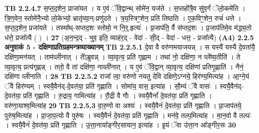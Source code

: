 \documentclass[17pt]{extarticle}
\begin{document}
                  \newline
                                \textbf{ TB 2.2.4.7} \newline
                  स॒प्त॒द॒शेन॒ प्राजा॑यत । य ए॒वं ॅवि॒द्वान्थ् सोमे॑न॒ यज॑ते । स॒प्तहो᳚त्रै॒व सु॑व॒र्गं ॅलो॒कमे॑ति । त्रि॒ण॒वेन॒ स्तोमे॑नै॒भ्यो लो॒केभ्यो॒ भ्रातृ॑व्या॒न्-प्रणु॑दते । त्र॒य॒स्त्रिꣳ॒॒शेन॒ प्रति॑ तिष्ठति । ए॒क॒विꣳ॒॒शेन॒ रुचं॑ धत्ते । स॒प्त॒द॒शेन॒ प्रजा॑यते । तस्मा᳚थ्-सप्तद॒शः स्तोमो॒ न नि॒र्॒.हृत्यः॑ । प्र॒जाप॑ति॒ र्वै स॑प्तद॒शः । प्र॒जाप॑तिमे॒व म॑द्ध्य॒तो ध॑त्ते॒ प्रजा᳚त्यै ( ) । \textbf{ 27} \newline
                  \newline
                                    (अ॒न॒न्द॒द् - भुव॒ इति॒ व्याह॑र॒द् - वेदा॑ - सी॒द् - वेदा॑ - धत्त॒ - प्रजा᳚त्यै) \textbf{(A4)} \newline \newline
                \textbf{ 2.2.5     अनुवाकं   5 - दक्षिणाप्रतिग्रहमन्त्रव्याख्यानम्} \newline
                                \textbf{ TB 2.2.5.1} \newline
                  दे॒वा वै वरु॑णमयाजयन्न् । स यस्यै॑ यस्यै दे॒वता॑यै॒ दक्षि॑णा॒मन॑यत् । ताम॑व्लीनात् । ते᳚ऽब्रुवन्न् । व्या॒वृत्य॒ प्रति॑ गृह्णाम । तथा॑ नो॒ दक्षि॑णा॒ न व्ले᳚ष्य॒तीति॑ । ते व्या॒वृत्य॒ प्रत्य॑गृह्णन्न् । ततो॒ वै तां दक्षि॑णा॒ नाव्ली॑नात् । य ए॒वं ॅवि॒द्वान् व्या॒वृत्य॒ दक्षि॑णां प्रतिगृ॒ह्णाति॑ । नैनं॒ दक्षि॑णा व्लीनाति । \textbf{ 28} \newline
                  \newline
                                \textbf{ TB 2.2.5.2} \newline
                  राजा᳚ त्वा॒ वरु॑णो नयतु देवि दक्षिणे॒ऽग्नये॒ हिर॑ण्य॒मित्या॑ह । आ॒ग्ने॒यं ॅवै हिर॑ण्यम् । स्वयै॒वैन॑द्-दे॒वत॑या॒ प्रति॑ गृह्णाति । सोमा॑य॒ वास॒ इत्या॑ह । सौ॒म्यं ॅवै वासः॑ । स्वयै॒वैन॑द्-दे॒वत॑या॒ प्रति॑ गृह्णाति । रु॒द्राय॒ गामित्या॑ह । रौ॒द्री वै गौः । स्वयै॒वैनां᳚ दे॒वत॑या॒ प्रति॑ गृह्णाति । वरु॑णा॒याश्व॒मित्या॑ह \textbf{ 29} \newline
                  \newline
                                \textbf{ TB 2.2.5.3} \newline
                  वा॒रु॒णो वा अश्वः॑ । स्वयै॒वैनं॑ दे॒वत॑या॒ प्रति॑ गृह्णाति । प्रा॒जाप॑तये॒ पुरु॑ष॒मित्या॑ह । प्रा॒जा॒प॒त्यो वै पुरु॑षः । स्वयै॒वैनं॑ दे॒वत॑या॒ प्रति॑ गृह्णाति । मन॑वे॒ तल्प॒मित्या॑ह । मा॒न॒वो वै तल्पः॑ । स्वयै॒वैनं॑ दे॒वत॑या॒ प्रति॑ गृह्णाति । उ॒त्ता॒नाया᳚ङ्गीर॒सायान॒ इत्या॑ह । इ॒यं ॅवा उ॑त्ता॒न आ᳚ङ्गीर॒सः \textbf{ 30} \newline
\end{document}
